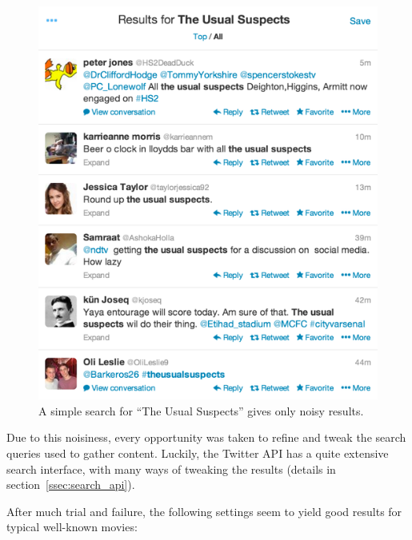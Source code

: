 \begin{figure}[h]
  \centering
    \includegraphics{Figures/search_simple}
  \caption{A simple search for ``The Usual Suspects'' gives only noisy results.}
  \label{fig:search_simple}
\end{figure}

Due to this noisiness, every opportunity was taken to refine and tweak the search queries used to gather content. Luckily, the Twitter API has a quite extensive search interface, with many ways of tweaking the results (details in section~\ref{ssec:search_api}).

After much trial and failure, the following settings seem to yield good results for typical well-known movies:

